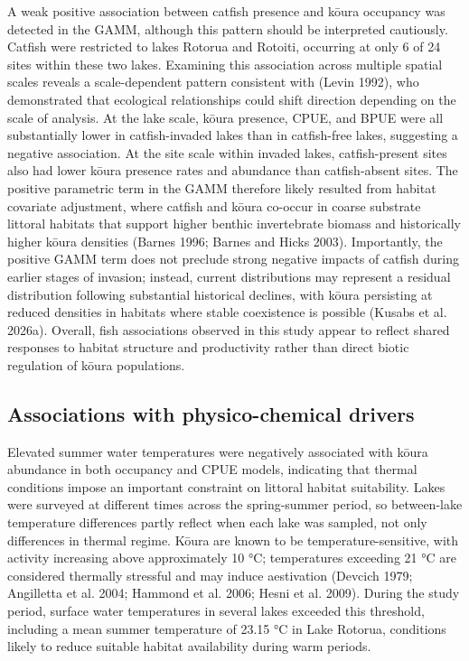 \documentclass[
  12pt,
  a4paper,
  oneside]{scrbook}
\begin{document}
A weak positive association between catfish presence and kōura occupancy
was detected in the GAMM, although this pattern should be interpreted
cautiously. Catfish were restricted to lakes Rotorua and Rotoiti,
occurring at only 6 of 24 sites within these two lakes. Examining this
association across multiple spatial scales reveals a scale-dependent
pattern consistent with (Levin 1992), who demonstrated that ecological
relationships could shift direction depending on the scale of analysis.
At the lake scale, kōura presence, CPUE, and BPUE were all substantially
lower in catfish-invaded lakes than in catfish-free lakes, suggesting a
negative association. At the site scale within invaded lakes,
catfish-present sites also had lower kōura presence rates and abundance
than catfish-absent sites. The positive parametric term in the GAMM
therefore likely resulted from habitat covariate adjustment, where
catfish and kōura co-occur in coarse substrate littoral habitats that
support higher benthic invertebrate biomass and historically higher
kōura densities (Barnes 1996; Barnes and Hicks 2003). Importantly, the
positive GAMM term does not preclude strong negative impacts of catfish
during earlier stages of invasion; instead, current distributions may
represent a residual distribution following substantial historical
declines, with kōura persisting at reduced densities in habitats where
stable coexistence is possible (Kusabs et al. 2026a). Overall, fish
associations observed in this study appear to reflect shared responses
to habitat structure and productivity rather than direct biotic
regulation of kōura populations.

\subsection{Associations with physico-chemical
drivers}\label{associations-with-physico-chemical-drivers}

Elevated summer water temperatures were negatively associated with kōura
abundance in both occupancy and CPUE models, indicating that thermal
conditions impose an important constraint on littoral habitat
suitability. Lakes were surveyed at different times across the
spring-summer period, so between-lake temperature differences partly
reflect when each lake was sampled, not only differences in thermal
regime. Kōura are known to be temperature-sensitive, with activity
increasing above approximately 10 °C; temperatures exceeding 21 °C are
considered thermally stressful and may induce aestivation (Devcich 1979;
Angilletta et al. 2004; Hammond et al. 2006; Hesni et al. 2009). During
the study period, surface water temperatures in several lakes exceeded
this threshold, including a mean summer temperature of 23.15 °C in Lake
Rotorua, conditions likely to reduce suitable habitat availability
during warm periods.
\end{document}
